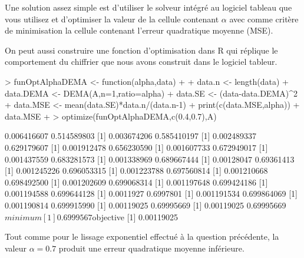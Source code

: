 \begin{solution}{1.5}
Une solution assez simple est d'utiliser le solveur intégré au logiciel tableau que vous utilisez et d'optimiser la valeur de la cellule contenant $\alpha$ avec comme critère de minimisation la cellule contenant l'erreur quadratique moyenne (MSE).

On peut aussi construire une fonction d'optimisation dans R qui réplique le comportement du chiffrier que nous avons construit dans le logiciel tableur.

\begin{Schunk}
\begin{Sinput}
> funOptAlphaDEMA <- function(alpha,data)
+ {
+   data.n <- length(data)
+   data.DEMA <- DEMA(A,n=1,ratio=alpha)
+   data.SE <- (data-data.DEMA)^2
+   data.MSE <- mean(data.SE)*data.n/(data.n-1)
+   print(c(data.MSE,alpha))
+   data.MSE
+ }
> optimize(funOptAlphaDEMA,c(0.4,0.7),A)
\end{Sinput}
\begin{Soutput}
[1] 0.006416607 0.514589803
[1] 0.003674206 0.585410197
[1] 0.002489337 0.629179607
[1] 0.001912478 0.656230590
[1] 0.001607733 0.672949017
[1] 0.001437559 0.683281573
[1] 0.001338969 0.689667444
[1] 0.00128047 0.69361413
[1] 0.001245226 0.696053315
[1] 0.001223788 0.697560814
[1] 0.001210668 0.698492500
[1] 0.001202609 0.699068314
[1] 0.001197648 0.699424186
[1] 0.001194588 0.699644128
[1] 0.0011927 0.6997801
[1] 0.001191534 0.699864069
[1] 0.001190814 0.699915990
[1] 0.00119025 0.69995669
[1] 0.00119025 0.69995669
$minimum
[1] 0.6999567

$objective
[1] 0.00119025
\end{Soutput}
\end{Schunk}

Tout comme pour le lissage exponentiel effectué à la question précédente, la valeur $\alpha=0.7$ produit une erreur quadratique moyenne inférieure.
\end{solution}
